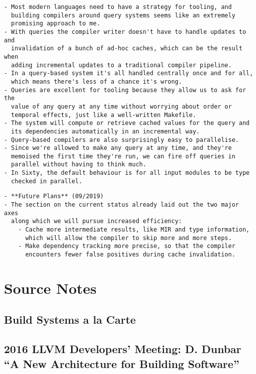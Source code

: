 \documentclass[12pt, a4paper]{report}
\begin{document}
\begin{verbatim}
- Most modern languages need to have a strategy for tooling, and
  building compilers around query systems seems like an extremely
  promising approach to me.
- With queries the compiler writer doesn't have to handle updates to and
  invalidation of a bunch of ad-hoc caches, which can be the result when
  adding incremental updates to a traditional compiler pipeline.
- In a query-based system it's all handled centrally once and for all,
  which means there's less of a chance it's wrong.
- Queries are excellent for tooling because they allow us to ask for the
  value of any query at any time without worrying about order or
  temporal effects, just like a well-written Makefile.
- The system will compute or retrieve cached values for the query and
  its dependencies automatically in an incremental way.
- Query-based compilers are also surprisingly easy to parallelise.
- Since we're allowed to make any query at any time, and they're
  memoised the first time they're run, we can fire off queries in
  parallel without having to think much.
- In Sixty, the default behaviour is for all input modules to be type
  checked in parallel.
\end{verbatim}

\begin{verbatim}
- **Future Plans** (09/2019)
- The section on the current status already laid out the two major axes
  along which we will pursue increased efficiency:
	- Cache more intermediate results, like MIR and type information,
	  which will allow the compiler to skip more and more steps.
	- Make dependency tracking more precise, so that the compiler
	  encounters fewer false positives during cache invalidation.
\end{verbatim}

\section*{Source Notes}

\subsection*{Build Systems a la Carte}

\subsection*{2016 LLVM Developers’ Meeting: D. Dunbar “A New Architecture for Building Software”}
\end{document}

